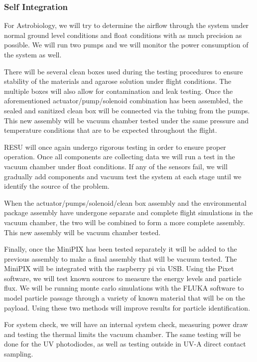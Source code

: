 \subsubsection{Self Integration}
For Astrobiology, we will try to determine the airflow through the system under normal ground level conditions and float conditions with as much precision as possible.  We will run two pumps and we will monitor the power consumption of the system as well.

There will be several clean boxes used during the testing procedures to ensure stability of the materials and agarose solution under flight conditions. The multiple boxes will also allow for contamination and leak testing. Once the aforementioned actuator/pump/solenoid combination has been assembled, the sealed and sanitized clean box will be connected via the tubing from the pumps. This new assembly will be vacuum chamber tested under the same pressure and temperature conditions that are to be expected throughout the flight. 

RESU will once again undergo rigorous testing in order to ensure proper operation. Once all components are collecting data we will run a test in the vacuum chamber under float conditions. If any of the sensors fail, we will gradually add components and vacuum test the system at each stage until we identify the source of the problem.

When the actuator/pumps/solenoid/clean box assembly and the environmental package assembly have undergone separate and complete flight simulations in the vacuum chamber, the two will be combined to form a more complete assembly. This new assembly will be vacuum chamber tested. 

Finally, once the MiniPIX has been tested separately it will be added to the previous assembly to make a final assembly that will be vacuum tested.  The MiniPIX will be integrated with the raspberry pi via USB. Using the Pixet software, we will test known sources to measure the energy levels and particle flux. We will be running monte carlo simulations with the FLUKA software to model particle passage through a variety of known material that will be on the payload. Using these two methods will improve results for particle identification.

For system check, we will have an internal system check, measuring power draw and testing the thermal limits the vacuum chamber. The same testing will be done for the UV photodiodes, as well as testing outside in UV-A direct contact sampling. 
    
